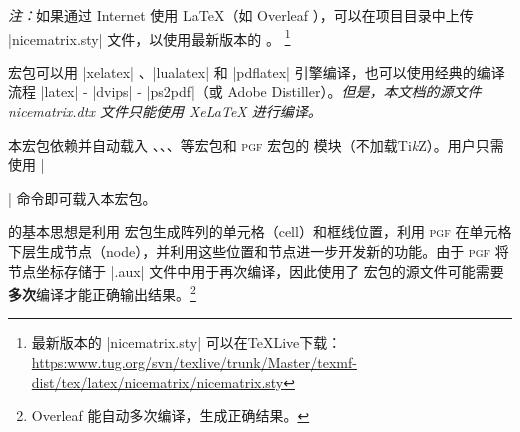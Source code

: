 \documentclass[dvipsnames]{article}%
\def\tikzname{Ti\emph{k}Z}
\begin{document}
\bigskip
\emph{注：}如果通过 Internet 使用 LaTeX（如 Overleaf ），可以在项目目录中上传 |nicematrix.sty| 文件，以使用最新版本的  。
\footnote{最新版本的 |nicematrix.sty| 可以在TeXLive下载：\newline
  \small
  \url{https:www.tug.org/svn/texlive/trunk/Master/texmf-dist/tex/latex/nicematrix/nicematrix.sty}}

\bigskip
宏包可以用 |xelatex| 、|lualatex| 和 |pdflatex| 引擎编译，也可以使用经典的编译流程 |latex| - |dvips| - |ps2pdf|（或 Adobe Distiller）。\textsl{但是，本文档的源文件 nicematrix.dtx 文件只能使用 XeLaTeX 进行编译。}

\bigskip
本宏包依赖并自动载入  、、、等宏包和 \textsc{pgf} 宏包的  模块（不加载\tikzname）。用户只需使用 |\usepackage{nicematrix}| 命令即可载入本宏包。

\bigskip
 的基本思想是利用  宏包生成阵列的单元格（cell）和框线位置，利用 \textsc{pgf} 在单元格下层生成节点（node），并利用这些位置和节点进一步开发新的功能。由于 \textsc{pgf} 将节点坐标存储于 |.aux| 文件中用于再次编译，因此使用了  宏包的源文件可能需要\textbf{多次}编译才能正确输出结果。\footnote{Overleaf 能自动多次编译，生成正确结果。}
\end{document}
